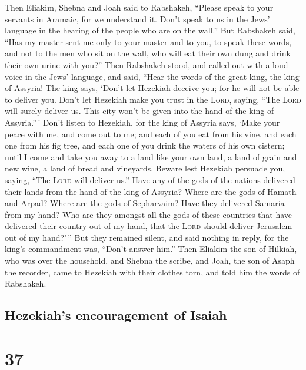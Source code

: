  Then Eliakim, Shebna and Joah said to Rabshakeh,
``Please speak to your servants in Aramaic, for we understand it. Don't
speak to us in the Jews' language in the hearing of the people who are
on the wall.''  But Rabshakeh said, ``Has my master sent
me only to your master and to you, to speak these words, and not to the
men who sit on the wall, who will eat their own dung and drink their own
urine with you?''  Then Rabshakeh stood, and called out
with a loud voice in the Jews' language, and said, ``Hear the words of
the great king, the king of Assyria!  The king says,
`Don't let Hezekiah deceive you; for he will not be able to deliver you.
 Don't let Hezekiah make you trust in the \textsc{Lord},
saying, ``The \textsc{Lord} will surely deliver us. This city won't be
given into the hand of the king of Assyria.''\,'  Don't
listen to Hezekiah, for the king of Assyria says, `Make your peace with
me, and come out to me; and each of you eat from his vine, and each one
from his fig tree, and each one of you drink the waters of his own
cistern;  until I come and take you away to a land like
your own land, a land of grain and new wine, a land of bread and
vineyards.  Beware lest Hezekiah persuade you, saying,
``The \textsc{Lord} will deliver us.'' Have any of the gods of the
nations delivered their lands from the hand of the king of Assyria?
 Where are the gods of Hamath and Arpad? Where are the
gods of Sepharvaim? Have they delivered Samaria from my hand?
 Who are they amongst all the gods of these countries
that have delivered their country out of my hand, that the \textsc{Lord}
should deliver Jerusalem out of my hand?'\,''  But they
remained silent, and said nothing in reply, for the king's commandment
was, ``Don't answer him.''  Then Eliakim the son of
Hilkiah, who was over the household, and Shebna the scribe, and Joah,
the son of Asaph the recorder, came to Hezekiah with their clothes torn,
and told him the words of Rabshakeh.

\hypertarget{hezekiahs-encouragement-of-isaiah}{%
\subsection{Hezekiah's encouragement of
Isaiah}\label{hezekiahs-encouragement-of-isaiah}}

\hypertarget{section-36}{%
\section{37}\label{section-36}}


